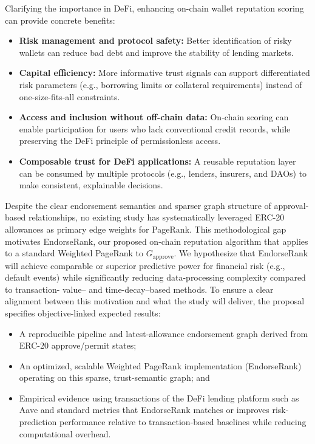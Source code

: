 \documentclass[12pt]{article}
\begin{document}
Clarifying the importance in DeFi, enhancing on-chain wallet reputation scoring can provide concrete benefits:


\begin{itemize}
\item[\textbullet] \textbf{Risk management and protocol safety: }Better identification of risky wallets can reduce bad debt and improve the stability of lending markets.
\item[\textbullet] \textbf{Capital efficiency: }More informative trust signals can support differentiated risk parameters (e.g., borrowing limits or collateral requirements) instead of one-size-fits-all constraints.
\item[\textbullet] \textbf{Access and inclusion without off-chain data: }On-chain scoring can enable participation for users who lack conventional credit records, while preserving the DeFi principle of permissionless access.
\item[\textbullet] \textbf{Composable trust for DeFi applications: }A reusable reputation layer can be consumed by multiple protocols (e.g., lenders, insurers, and DAOs) to make consistent, explainable decisions.
\end{itemize}
Despite the clear endorsement semantics and sparser graph structure of approval-based relationships, no existing study has systematically leveraged ERC-20 allowances as primary edge weights for PageRank. This methodological gap motivates EndorseRank, our proposed on-chain reputation algorithm that applies to a standard Weighted PageRank to $G_{\text{approve}}$. We hypothesize that EndorseRank will achieve comparable or superior predictive power for financial risk (e.g., default events) while significantly reducing data-processing complexity compared to transaction- value-- and time-decay--based methods. To ensure a clear alignment between this motivation and what the study will deliver, the proposal specifies objective-linked expected results:


\begin{itemize}
\item[\textbullet] A reproducible pipeline and latest-allowance endorsement graph derived from ERC-20 approve/permit states;
\item[\textbullet] An optimized, scalable Weighted PageRank implementation (EndorseRank) operating on this sparse, trust-semantic graph; and
\item[\textbullet] Empirical evidence using transactions of the DeFi lending platform such as Aave and standard metrics that EndorseRank matches or improves risk-prediction performance relative to transaction-based baselines while reducing computational overhead.
\end{itemize}
\clearpage
{}
\end{document}
